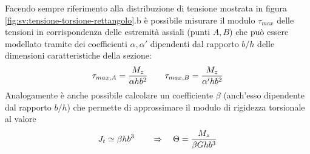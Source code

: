     		Facendo sempre riferimento alla distribuzione di tensione mostrata in figura \ref{fig:sv:tensione-torsione-rettangolo}.b è possibile misurare il modulo $\tau_{max}$ delle tensioni in corrispondenza delle estremità assiali (punti $A,B$) che può essere modellato tramite dei coefficienti $\alpha,\alpha'$ dipendenti dal rapporto $b/h$ delle dimensioni caratteristiche della sezione:
    		\[ \tau_{max,A} = \frac{M_z}{\alpha h b^2} \qquad \tau_{max,B} = \frac{M_z}{\alpha'hb^2}  \]
    		Analogamente è anche possibile calcolare un coefficiente $\beta$ (anch'esso dipendente dal rapporto $b/h$) che permette di approssimare il modulo di rigidezza torsionale al valore
    		\[ J_t \simeq \beta h b^3 \qquad \Rightarrow \quad \Theta = \frac {M_z} {\beta G hb^3}  \]
    		
    	
    	
    	
    	
    	
    	
    	
    	
    	
    	
    	
    	
    	
    	
    	
    	
    	
    